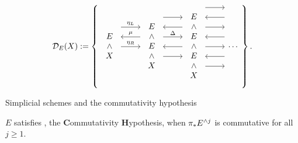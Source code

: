 \[\mathcal{D}_E(X) := \left\{
\begin{tikzcd}
\begin{array}{c} E \\ \sm \\ X \end{array} \arrow[leftarrow, shift left=\baselineskip]{r}{\mu} \arrow[shift left=(2*\baselineskip)]{r}{\eta_L} \arrow{r}{\eta_R} &
\begin{array}{c} E \\ \sm \\ E \\ \sm \\ X \end{array} \arrow[shift left=(3*\baselineskip)]{r} \arrow[leftarrow, shift left=(2*\baselineskip)]{r} \arrow[shift left=\baselineskip]{r}{\Delta} \arrow[leftarrow]{r} \arrow[shift right=\baselineskip]{r} &
\begin{array}{c} E \\ \sm \\ E \\ \sm \\ E \\ \sm \\ X \end{array} \arrow[shift left=(4*\baselineskip)]{r} \arrow[leftarrow, shift left=(3*\baselineskip)]{r} \arrow[shift left=(2*\baselineskip)]{r} \arrow[leftarrow, shift left=\baselineskip]{r} \arrow{r} \arrow[leftarrow, shift right=\baselineskip]{r} \arrow[shift right=(2*\baselineskip)]{r} &
\cdots
\end{tikzcd}
\right\}.\]

Simplicial schemes and the commutativity hypothesis

\begin{definition}
$E$ satisfies \CH, the \textbf Commutativity \textbf Hypothesis, when $\pi_* E^{\wedge j}$ is commutative for all $j \ge 1$.
\end{definition}

